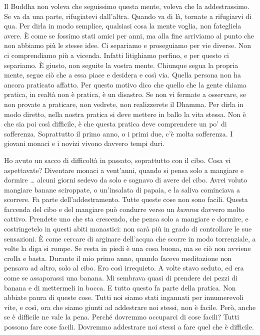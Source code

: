 Il Buddha non voleva che seguissimo questa mente, voleva che la
addestrassimo. Se va da una parte, rifugiatevi dall'altra. Quando va di
là, tornate a rifugiarvi di qua. Per dirla in modo semplice, qualsiasi
cosa la mente voglia, non fategliela avere. È come se fossimo stati
amici per anni, ma alla fine arriviamo al punto che non abbiamo più le
stesse idee. Ci separiamo e proseguiamo per vie diverse. Non ci
comprendiamo più a vicenda. Infatti litighiamo perfino, e per questo ci
separiamo. È giusto, non seguite la vostra mente. Chiunque segua la
propria mente, segue ciò che a essa piace e desidera e così via. Quella
persona non ha ancora praticato affatto. Per questo motivo dico che
quello che la gente chiama pratica, in realtà non è pratica, è un
disastro. Se non vi fermate a osservare, se non provate a praticare, non
vedrete, non realizzerete il Dhamma. Per dirla in modo diretto, nella
nostra pratica si deve mettere in ballo la vita stessa. Non è che sia
poi così difficile, è che questa pratica deve comprendere un po' di
sofferenza. Soprattutto il primo anno, o i primi due, c'è molta
sofferenza. I giovani monaci e i novizi vivono davvero tempi duri.

Ho avuto un sacco di difficoltà in passato, soprattutto con il cibo.
Cosa vi aspettavate? Diventare monaci a vent'anni, quando si pensa solo
a mangiare e dormire \ldots{} alcuni giorni sedevo da solo e sognavo di avere
del cibo. Avrei voluto mangiare banane sciroppate, o un'insalata di
papaia, e la saliva cominciava a scorrere. Fa parte dell'addestramento.
Tutte queste cose non sono facili. Questa faccenda del cibo e del
mangiare può condurre verso un \emph{kamma} davvero molto cattivo.
Prendete uno che sta crescendo, che pensa solo a mangiare e dormire, e
costringetelo in questi abiti monastici: non sarà più in grado di
controllare le sue sensazioni. È come cercare di arginare dell'acqua che
scorre in modo torrenziale, a volte la diga si rompe. Se resta in piedi
è una cosa buona, ma se ciò non avviene crolla e basta. Durante il mio
primo anno, quando facevo meditazione non pensavo ad altro, solo al
cibo. Ero così irrequieto. A volte stavo seduto, ed era come se
assaporassi una banana. Mi sembrava quasi di prendere dei pezzi di
banana e di mettermeli in bocca. E tutto questo fa parte della pratica.
Non abbiate paura di queste cose. Tutti noi siamo stati ingannati per
innumerevoli vite, e così, ora che siamo giunti ad addestrare noi
stessi, non è facile. Però, anche se è difficile ne vale la pena. Perché
dovremmo occuparci di cose facili? Tutti possono fare cose facili.
Dovremmo addestrare noi stessi a fare quel che è difficile.

